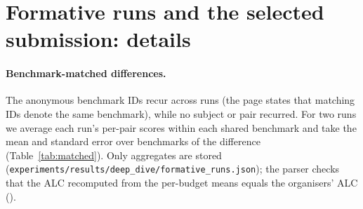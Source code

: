 \documentclass{article}
\begin{document}
\appendix

\section{Formative runs and the selected submission: details}
\label{app:formative}

\paragraph{Benchmark-matched differences.} The anonymous benchmark IDs recur across runs (the page states that matching IDs denote the same benchmark), while no subject or pair recurred. For two runs we average each run's per-pair scores within each shared benchmark and take the mean and standard error over benchmarks of the difference (Table~\ref{tab:matched}). Only aggregates are stored (\texttt{experiments/results/deep\_dive/formative\_runs.json}); the parser checks that the ALC recomputed from the per-budget means equals the organisers' ALC (\FmSelAlcConsistent).

\begin{table}[htbp]
\caption{Benchmark-matched differences between formative runs: mean (standard error) over the \FmMatchSelShipN{} shared benchmarks. Negative favours the first run. In the ALC column no entry reaches two standard errors (largest $|t|=\FmMatchMaxAbsT$). Of all \FmMatchNEntries{} entries, \FmMatchNAboveTwo{} reaches two standard errors (largest $|t|=\FmMatchMaxAbsTAll$), and \FmMatchNAboveCrit{} reach the two-sided 5\% critical value of $t$ with \FmMatchDf{} degrees of freedom (\FmMatchTCrit), before any correction for the \FmMatchNEntries{} comparisons.}
\label{tab:matched}
\centering\footnotesize\setlength{\tabcolsep}{3pt}
\end{table}
\end{document}
